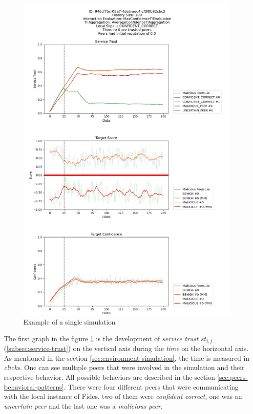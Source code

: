 \begin{figure}
    \centering
    \includegraphics[width=1.0\textwidth]{assets/example_evaluation.png}
    \caption{Example of a single simulation}
    \label{fig:single-simulation-example}
\end{figure}

The first graph in the figure \ref{fig:single-simulation-example} is the development of \textit{service trust} $st_{i, j}$ (\ref{subsec:service-trust}) on the vertical axis during the \textit{time} on the horizontal axis. As mentioned in the section \ref{sec:environment-simulation}, the time is measured in \textit{clicks}.
One can see multiple peers that were involved in the simulation and their respective behavior. All possible behaviors are described in the section \ref{sec:peers-behavioral-patterns}.
There were four different peers that were communicating with the local instance of Fides, two of them were \textit{confident correct}, one was an \textit{uncertain peer} and the last one was a \textit{malicious peer}.

